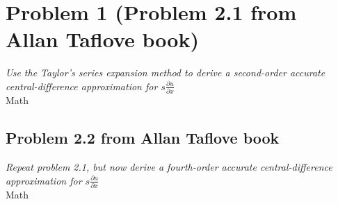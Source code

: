 \section{Problem 1 (Problem 2.1 from Allan Taflove book)}
\textit{Use the Taylor's series expansion method to derive a second-order accurate central-difference approximation for $s\frac{\partial u}{\partial x}$}\\

Math

\subsection{Problem 2.2 from Allan Taflove book}
\textit{Repeat problem 2.1, but now derive a fourth-order accurate central-difference approximation for $s\frac{\partial u}{\partial x}$}\\


Math